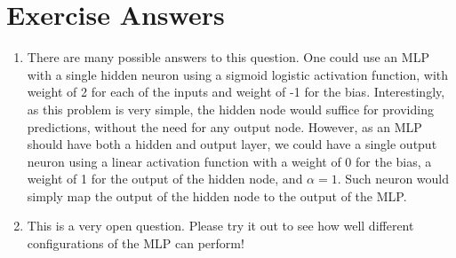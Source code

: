 \section{Exercise Answers}

\begin{enumerate}
\item There are many possible answers to this question. One could use an MLP with a single hidden neuron using a sigmoid logistic activation function, with weight of 2 for each of the inputs and weight of -1 for the bias. Interestingly, as this problem is very simple, the hidden node would suffice for providing predictions, without the need for any output node. However, as an MLP should have both a hidden and output layer, we could have a single output neuron using a linear activation function with a weight of 0 for the bias, a weight of 1 for the output of the hidden node, and $\alpha=1$. Such neuron would simply map the output of the hidden node to the output of the MLP.

\item This is a very open question. Please try it out to see how well different configurations of the MLP can perform!
\end{enumerate}



